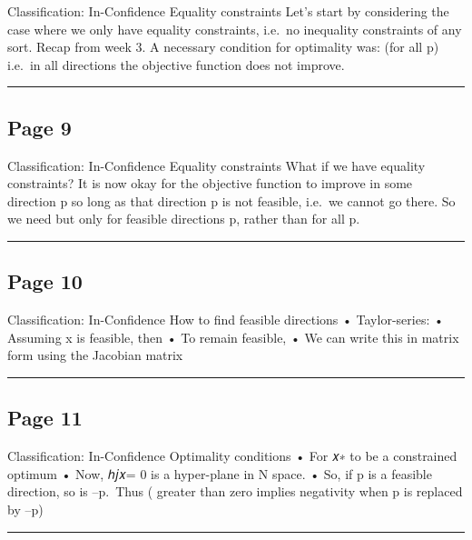 \documentclass[
]{article}
\begin{document}
Classification: In-Confidence Equality constraints Let's start by
considering the case where we only have equality constraints, i.e.~no
inequality constraints of any sort. Recap from week 3. A necessary
condition for optimality was: (for all p) i.e.~in all directions the
objective function does not improve.

\begin{center}\rule{0.5\linewidth}{0.5pt}\end{center}

\subsection{Page 9}\label{page-9}

Classification: In-Confidence Equality constraints What if we have
equality constraints? It is now okay for the objective function to
improve in some direction p so long as that direction p is not feasible,
i.e.~we cannot go there. So we need but only for feasible directions p,
rather than for all p.

\begin{center}\rule{0.5\linewidth}{0.5pt}\end{center}

\subsection{Page 10}\label{page-10}

Classification: In-Confidence How to find feasible directions •
Taylor-series: • Assuming x is feasible, then • To remain feasible, • We
can write this in matrix form using the Jacobian matrix

\begin{center}\rule{0.5\linewidth}{0.5pt}\end{center}

\subsection{Page 11}\label{page-11}

Classification: In-Confidence Optimality conditions • For 𝑥∗ to be a
constrained optimum • Now, ℎ𝑗𝑥= 0 is a hyper-plane in N space. • So, if
p is a feasible direction, so is --p.~Thus ( greater than zero implies
negativity when p is replaced by --p)

\begin{center}\rule{0.5\linewidth}{0.5pt}\end{center}
\end{document}
